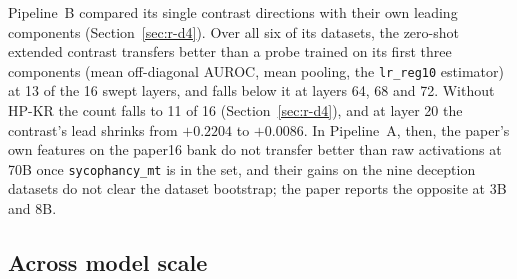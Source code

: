 Pipeline~B compared its single contrast directions with their own leading components (Section~\ref{sec:r-d4}).
Over all six of its datasets, the zero-shot extended contrast transfers better than a probe trained on its first three components (mean off-diagonal AUROC, mean pooling, the \texttt{lr\_reg10} estimator) at 13 of the 16 swept layers, and falls below it at layers 64, 68 and 72. %
Without HP-KR the count falls to 11 of 16 (Section~\ref{sec:r-d4}), and at layer 20 the contrast's lead shrinks from $+0.2204$ to $+0.0086$. %
In Pipeline~A, then, the paper's own features on the paper16 bank do not transfer better than raw activations at 70B once \texttt{sycophancy\_mt} is in the set, and their gains on the nine deception datasets do not clear the dataset bootstrap; the paper reports the opposite at 3B and 8B. %

\subsection{Across model scale}
\label{sec:r-scale}

